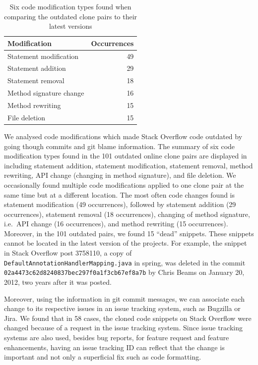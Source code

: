 \documentclass[10pt,journal,compsoc]{IEEEtran}
\begin{document}
\begin{table}
	\centering
	\caption{Six code modification types found when comparing the outdated clone pairs to their latest versions}
	\label{tab:mod_types}
		\begin{tabular}{lr}
			\toprule
			Modification & Occurrences \\
			\midrule
			Statement modification & 49 \\
			Statement addition & 29 \\
			Statement removal & 18 \\
			Method signature change & 16 \\
			Method rewriting & 15 \\
			File deletion & 15 \\
			\bottomrule 
		\end{tabular}
\end{table}

We analysed code modifications which made Stack Overflow code outdated by going
though commits and git blame information. The summary of six code modification
types found in the 101 outdated online clone pairs are displayed in
 including statement addition, statement modification,
statement removal, method rewriting, API change (changing in method signature),
and file deletion. We occasionally found multiple code modifications applied to
one clone pair at the same time but at a different location. The most often code
changes found is statement modification (49 occurrences), followed by statement
addition (29 occurrences), statement removal (18 occurrences), changing of
method signature, i.e.~API change (16 occurrences), and method rewriting (15
occurrences). Moreover, in the 101 outdated pairs, we found 15 ``dead''
snippets. These snippets cannot be located in the latest version of the
projects. For example, the snippet in Stack Overflow post 3758110, a copy of
{\small{\texttt{DefaultAnnotationHandlerMapping.java}}} in \textsf{spring}, was
deleted in the commit
{\small{\texttt{02a4473c62d8240837bec297f0a1f3cb67ef8a7b}}} by Chris Beams on
January 20, 2012, two years after it was posted.

Moreover, using the information in git commit messages, we can associate each
change to its respective issues in an issue tracking system, such as Bugzilla or
Jira. We found that in 58 cases, the cloned code snippets on Stack Overflow were
changed because of a request in the issue tracking system. Since issue tracking
systems are also used, besides bug reports, for feature request and feature
enhancements, having an issue tracking ID can reflect that the change is important
and not only a superficial fix such as code formatting.
\end{document}
